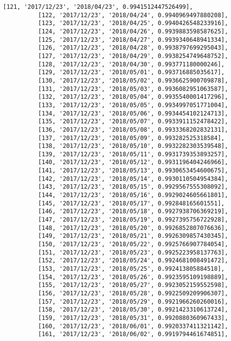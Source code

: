 \documentclass[11pt]{article}
\begin{document}
\begin{Verbatim}[commandchars=\\\{\}]
          [121, '2017/12/23', '2018/04/23', 0.9941512447526499],
          [122, '2017/12/23', '2018/04/24', 0.9940969497880208],
          [123, '2017/12/23', '2018/04/25', 0.9940426548233916],
          [124, '2017/12/23', '2018/04/26', 0.9939883598587625],
          [125, '2017/12/23', '2018/04/27', 0.9939340648941334],
          [126, '2017/12/23', '2018/04/28', 0.9938797699295043],
          [127, '2017/12/23', '2018/04/29', 0.9938254749648752],
          [128, '2017/12/23', '2018/04/30', 0.993771180000246],
          [129, '2017/12/23', '2018/05/01', 0.993716885035617],
          [130, '2017/12/23', '2018/05/02', 0.9936625900709878],
          [131, '2017/12/23', '2018/05/03', 0.9936082951063587],
          [132, '2017/12/23', '2018/05/04', 0.9935540001417296],
          [133, '2017/12/23', '2018/05/05', 0.9934997051771004],
          [134, '2017/12/23', '2018/05/06', 0.9934454102124713],
          [135, '2017/12/23', '2018/05/07', 0.9933911152478422],
          [136, '2017/12/23', '2018/05/08', 0.9933368202832131],
          [137, '2017/12/23', '2018/05/09', 0.993282525318584],
          [138, '2017/12/23', '2018/05/10', 0.9932282303539548],
          [139, '2017/12/23', '2018/05/11', 0.9931739353893257],
          [140, '2017/12/23', '2018/05/12', 0.9931196404246966],
          [141, '2017/12/23', '2018/05/13', 0.9930653454600675],
          [142, '2017/12/23', '2018/05/14', 0.9930110504954384],
          [143, '2017/12/23', '2018/05/15', 0.9929567555308092],
          [144, '2017/12/23', '2018/05/16', 0.9929024605661801],
          [145, '2017/12/23', '2018/05/17', 0.992848165601551],
          [146, '2017/12/23', '2018/05/18', 0.9927938706369219],
          [147, '2017/12/23', '2018/05/19', 0.9927395756722928],
          [148, '2017/12/23', '2018/05/20', 0.9926852807076636],
          [149, '2017/12/23', '2018/05/21', 0.9926309857430345],
          [150, '2017/12/23', '2018/05/22', 0.9925766907784054],
          [151, '2017/12/23', '2018/05/23', 0.9925223958137763],
          [152, '2017/12/23', '2018/05/24', 0.9924681008491472],
          [153, '2017/12/23', '2018/05/25', 0.992413805884518],
          [154, '2017/12/23', '2018/05/26', 0.9923595109198889],
          [155, '2017/12/23', '2018/05/27', 0.9923052159552598],
          [156, '2017/12/23', '2018/05/28', 0.9922509209906307],
          [157, '2017/12/23', '2018/05/29', 0.9921966260260016],
          [158, '2017/12/23', '2018/05/30', 0.9921423310613724],
          [159, '2017/12/23', '2018/05/31', 0.9920880360967433],
          [160, '2017/12/23', '2018/06/01', 0.9920337411321142],
          [161, '2017/12/23', '2018/06/02', 0.9919794461674851],

\end{Verbatim}
\end{document}
